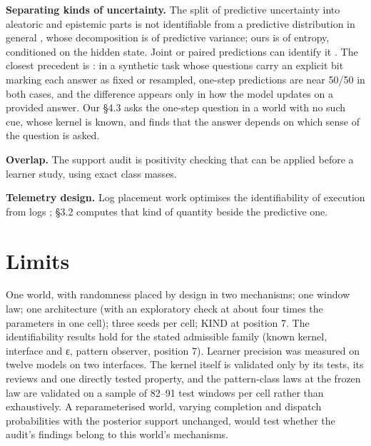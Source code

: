 \documentclass[10pt]{article}
\begin{document}
\textbf{Separating kinds of uncertainty.} The split of predictive uncertainty into aleatoric and epistemic parts is not
identifiable from a predictive distribution in general \citep{bergna2026decoupled}, whose decomposition is of predictive
variance; ours is of entropy, conditioned on the hidden state. Joint or paired predictions can identify it
\citep{osband2021epistemic, johnson2024experts}. The closest precedent is \citet[Section 5.1]{ahdritz2024knowable}: in a synthetic task
whose questions carry an explicit bit marking each answer as fixed or resampled, one-step predictions are near 50/50 in
both cases, and the difference appears only in how the model updates on a provided answer. Our §4.3 asks the one-step
question in a world with no such cue, whose kernel is known, and finds that the answer depends on which sense of the
question is asked.

\textbf{Overlap.} The support audit is positivity checking \citep{petersen2012positivity, damour2017overlap} that can be applied
before a learner study, using exact class masses.

\textbf{Telemetry design.} Log placement work optimises the identifiability of execution from logs \citep{zhao2017log20}; §3.2
computes that kind of quantity beside the predictive one.

\hypertarget{limits}{%
\section{Limits}\label{limits}}

One world, with randomness placed by design in two mechanisms; one window law; one architecture (with an exploratory
check at about four times the parameters in one cell); three seeds per cell; KIND at position 7. The identifiability
results hold for the stated admissible family (known kernel, interface and ε, pattern observer, position 7). Learner
precision was measured on twelve models on two interfaces. The kernel itself is validated only by its tests, its
reviews and one directly tested property, and the pattern-class laws at the frozen law are validated on a sample of
82--91 test windows per cell rather than exhaustively. A reparameterised world, varying completion and dispatch probabilities with
the posterior support unchanged, would test whether the audit's findings belong to this world's mechanisms.
\end{document}
